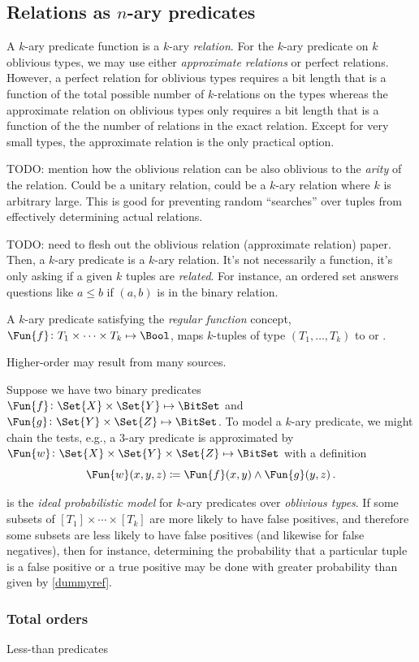 \documentclass[ ../main.tex]{subfiles}
\begin{document}
\subsection{Relations as $n$-ary predicates}

A $k$-ary predicate function is a $k$-ary \emph{relation}. For the $k$-ary predicate on $k$ oblivious types, we may use either \emph{approximate relations} or perfect relations. However, a perfect relation for oblivious types requires a bit length that is a function of the total possible number of $k$-relations on the types whereas the approximate relation on oblivious types only requires a bit length that is a function of the the number of relations in the exact relation.
Except for very small types, the approximate relation is the only practical option.

TODO: mention how the oblivious relation can be also oblivious to the \emph{arity} of the relation.
Could be a unitary relation, could be a $k$-ary relation where $k$ is arbitrary large. This is good for preventing random ``searches'' over tuples from effectively determining actual relations.

TODO: need to flesh out the oblivious relation (approximate relation) paper.
Then, a $k$-ary predicate is a $k$-ary relation. It's not necessarily a function, it's only asking if a given $k$ tuples are \emph{related}. For instance, an ordered set answers questions like $a \leq b$ if $(a,b)$ is in the binary relation.

A $k$-ary predicate satisfying the \emph{regular function} concept, $\Fun{f} \colon T_1 \times \cdots \times T_k \mapsto \Bool$, maps $k$-tuples of type $(T_1,\ldots,T_k)$ to \True or \False.




Higher-order may result from many sources.

Suppose we have two binary predicates $\Fun{f} \colon \Set{X} \times \Set{Y} \mapsto \BitSet$ and $\Fun{g} \colon \Set{Y} \times \Set{Z} \mapsto \BitSet$.
To model a $k$-ary predicate, we might chain the tests, e.g., a $3$-ary predicate is approximated by $\Fun{w} \colon \Set{X} \times \Set{Y} \times \Set{Z} \mapsto \BitSet$ with a definition
\begin{equation}
	\Fun{w}(x,y,z) \coloneqq \Fun{f}(x,y) \land \Fun{g}(y,z)\,.
\end{equation}


 is the \emph{ideal probabilistic model} for $k$-ary predicates over \emph{oblivious types}.
If some subsets of $[T_1] \times \cdots \times [T_k]$ are more likely to have false positives, and therefore some subsets are less likely to have false positives (and likewise for false negatives), then for instance, determining the probability that a particular tuple is a false positive or a true positive may be done with greater probability than given by \cref{dummyref}.

\subsubsection{Total orders}
Less-than predicates
\end{document}
